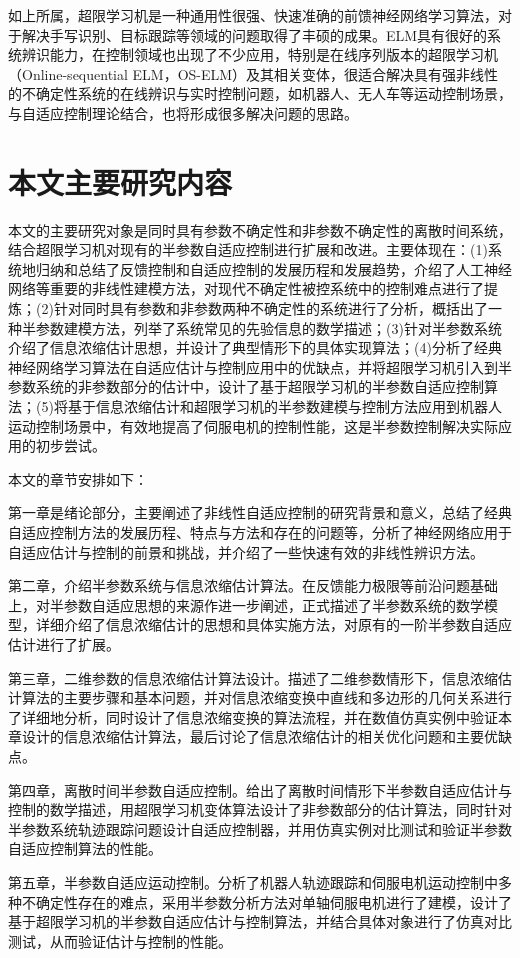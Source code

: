 如上所属，超限学习机是一种通用性很强、快速准确的前馈神经网络学习算法，对于解决手写识别、目标跟踪等领域的问题取得了丰硕的成果。ELM具有很好的系统辨识能力，在控制领域也出现了不少应用，特别是在线序列版本的超限学习机（Online-sequential ELM，OS-ELM）及其相关变体，很适合解决具有强非线性的不确定性系统的在线辨识与实时控制问题，如机器人、无人车等运动控制场景，与自适应控制理论结合，也将形成很多解决问题的思路。

\section{本文主要研究内容}\label{sect:1.3}

本文的主要研究对象是同时具有参数不确定性和非参数不确定性的离散时间系统，结合超限学习机对现有的半参数自适应控制进行扩展和改进。主要体现在：(1)系统地归纳和总结了反馈控制和自适应控制的发展历程和发展趋势，介绍了人工神经网络等重要的非线性建模方法，对现代不确定性被控系统中的控制难点进行了提炼；(2)针对同时具有参数和非参数两种不确定性的系统进行了分析，概括出了一种半参数建模方法，列举了系统常见的先验信息的数学描述；(3)针对半参数系统介绍了信息浓缩估计思想，并设计了典型情形下的具体实现算法；(4)分析了经典神经网络学习算法在自适应估计与控制应用中的优缺点，并将超限学习机引入到半参数系统的非参数部分的估计中，设计了基于超限学习机的半参数自适应控制算法；(5)将基于信息浓缩估计和超限学习机的半参数建模与控制方法应用到机器人运动控制场景中，有效地提高了伺服电机的控制性能，这是半参数控制解决实际应用的初步尝试。

本文的章节安排如下：

第一章是绪论部分，主要阐述了非线性自适应控制的研究背景和意义，总结了经典自适应控制方法的发展历程、特点与方法和存在的问题等，分析了神经网络应用于自适应估计与控制的前景和挑战，并介绍了一些快速有效的非线性辨识方法。

第二章，介绍半参数系统与信息浓缩估计算法。在反馈能力极限等前沿问题基础上，对半参数自适应思想的来源作进一步阐述，正式描述了半参数系统的数学模型，详细介绍了信息浓缩估计的思想和具体实施方法，对原有的一阶半参数自适应估计进行了扩展。

第三章，二维参数的信息浓缩估计算法设计。描述了二维参数情形下，信息浓缩估计算法的主要步骤和基本问题，并对信息浓缩变换中直线和多边形的几何关系进行了详细地分析，同时设计了信息浓缩变换的算法流程，并在数值仿真实例中验证本章设计的信息浓缩估计算法，最后讨论了信息浓缩估计的相关优化问题和主要优缺点。

第四章，离散时间半参数自适应控制。给出了离散时间情形下半参数自适应估计与控制的数学描述，用超限学习机变体算法设计了非参数部分的估计算法，同时针对半参数系统轨迹跟踪问题设计自适应控制器，并用仿真实例对比测试和验证半参数自适应控制算法的性能。

第五章，半参数自适应运动控制。分析了机器人轨迹跟踪和伺服电机运动控制中多种不确定性存在的难点，采用半参数分析方法对单轴伺服电机进行了建模，设计了基于超限学习机的半参数自适应估计与控制算法，并结合具体对象进行了仿真对比测试，从而验证估计与控制的性能。
